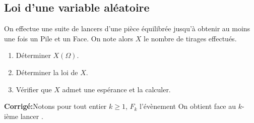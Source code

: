 \documentclass[a4paper,twoside,french,11pt]{VcCours}
\newcommand{\corr}{\textbf{Corrigé:}}
\begin{document}

\tableofcontents
\separationTitre


\subsection{Loi d'une variable aléatoire}


\begin{Exercice}{} On effectue une suite de lancers d'une pièce équilibrée jusqu'à obtenir au moins une fois un Pile et un Face. On note alors $X$ le nombre de tirages effectués.

\begin{enumerate}
\item Déterminer $X(\Omega)$.
\item Déterminer la loi de $X$. 
\item Vérifier que $X$ admet une espérance et la calculer.
\end{enumerate}
\end{Exercice}

\corr Notons pour tout entier $k \geq 1$, $F_k$ l'évènement \og On obtient face au $k$-ième lancer \fg .
\end{document}
